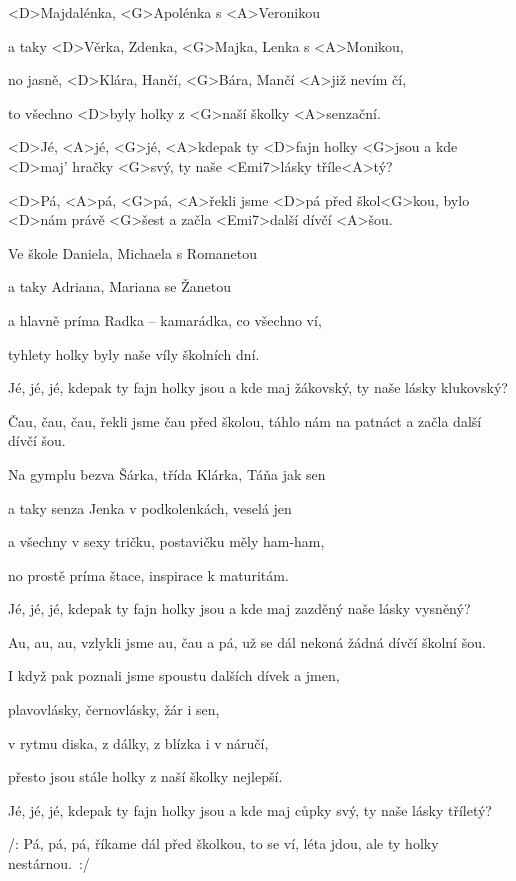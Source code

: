 

\zs
<D>Majdalénka, <G>Apolénka s <A>Veronikou

a taky <D>Věrka, Zdenka, <G>Majka, Lenka s <A>Monikou,

no jasně, <D>Klára, Hančí, <G>Bára, Mančí <A>již nevím čí,

to všechno <D>byly holky z <G>naší školky <A>senzační.
\ks

\zr
<D>Jé, <A>jé, <G>jé,
<A>kdepak ty <D>fajn holky <G>jsou
a kde <D>maj' hračky <G>svý,
ty naše <Emi7>lásky tříle<A>tý?

<D>Pá, <A>pá, <G>pá,
<A>řekli jsme <D>pá před škol<G>kou,
bylo <D>nám právě <G>šest
a začla <Emi7>další dívčí <A>šou.
\kr

\zs
Ve škole Daniela, Michaela s Romanetou

a taky Adriana, Mariana se Žanetou

a hlavně príma Radka -- kamarádka, co všechno ví,

tyhlety holky byly naše víly školních dní.
\ks

\zr
Jé, jé, jé, kdepak ty fajn holky jsou
a kde maj žákovský, ty naše lásky klukovský?

Čau, čau, čau, řekli jsme čau před školou,
táhlo nám na patnáct a začla další dívčí šou.
\kr

\zs
Na gymplu bezva Šárka, třída Klárka, Táňa jak sen

a taky senza Jenka v podkolenkách, veselá jen

a všechny v sexy tričku, postavičku měly ham-ham,

no prostě príma štace, inspirace k maturitám.
\ks

\zr
Jé, jé, jé,
kdepak ty fajn holky jsou
a kde maj zazděný
naše lásky vysněný?

Au, au, au,
vzlykli jsme au, čau a pá,
už se dál nekoná
žádná dívčí školní šou.
\kr

\zs
I když pak poznali jsme spoustu dalších dívek a jmen,

plavovlásky, černovlásky, žár i sen,

v rytmu diska, z dálky, z blízka i v náručí,

přesto jsou stále holky z naší školky nejlepší.
\ks

\zr
Jé, jé, jé,
kdepak ty fajn holky jsou
a kde maj cůpky svý,
ty naše lásky tříletý?

/: Pá, pá, pá,
říkame dál před školkou,
to se ví, léta jdou,
ale ty holky nestárnou.~:/
\kr

\kp
